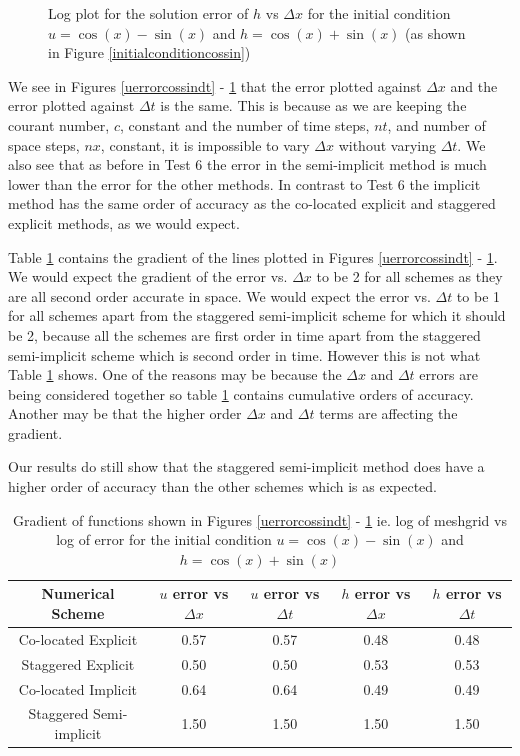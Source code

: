\documentclass[a4paper,12pt, notitlepage]{article}
\begin{document}
{\begin{figure} [H]
\begin{minipage}{.5\textwidth}
	\caption{\label{herrorcossindx}Log plot for the solution error of $h$ vs $\Delta x$ for the initial condition $u = \cos(x) - \sin(x)$ and $h = \cos(x) + \sin(x)$ (as shown in Figure \ref{initialconditioncossin})} 
\end{minipage}
\end{figure}
We see in Figures \ref{uerrorcossindt} - \ref{herrorcossindx} that the error plotted against $\Delta x$ and the error plotted against $\Delta t$ is the same. This is because as we are keeping the courant number, $c$, constant and the number of time steps, $nt$, and number of space steps, $nx$, constant, it is impossible to vary $\Delta x$ without varying $\Delta t$. We also see that as before in Test 6 the error in the semi-implicit method is much lower than the error for the other methods. In contrast to Test 6 the implicit method has the same order of accuracy as the co-located explicit and staggered explicit methods, as we would expect.

Table \ref{gradient} contains the gradient of the lines plotted in Figures \ref{uerrorcossindt} - \ref{herrorcossindx}. We would expect the gradient of the error vs. $\Delta x$ to be 2 for all schemes as they are all second order accurate in space. We would expect the error vs. $\Delta t$ to be 1 for all schemes apart from the staggered semi-implicit scheme for which it should be 2, because all the schemes are first order in time apart from the staggered semi-implicit scheme which is second order in time. However this is not what Table \ref{gradient} shows. One of the reasons may be because the $\Delta x$ and $\Delta t$ errors are being considered together so table \ref{gradient} contains cumulative orders of accuracy. Another may be that the higher order $\Delta x$ and $\Delta t$ terms are affecting the gradient. 

Our results do still show that the staggered semi-implicit method does have a higher order of accuracy than the other schemes which is as expected.

\begin{table}[H]
	\centering
	\begin{tabular}{|c | c| c| c| c|} 
		\hline
		\textbf{Numerical Scheme} & $u$ error vs $\Delta x$ &  $u$ error vs $\Delta t$ & $h$ error vs $\Delta x$ & $h$ error vs $\Delta t$\\
		\hline
		Co-located Explicit & 0.57 & 0.57 & 0.48 & 0.48\\ 
		\hline
		Staggered Explicit & 0.50 & 0.50 & 0.53 & 0.53 \\
		\hline
		Co-located Implicit & 0.64 & 0.64 & 0.49 & 0.49 \\
		\hline
		Staggered Semi-implicit & 1.50 & 1.50 & 1.50 & 1.50\\
		\hline
	\end{tabular}
	\caption{Gradient of functions shown in Figures \ref{uerrorcossindt} - \ref{herrorcossindx} ie. log of meshgrid vs log of error for the initial condition $u = \cos(x) - \sin(x)$ and $h = \cos(x) + \sin(x)$}
	\label{gradient}
\end{table}


}
\end{document}
